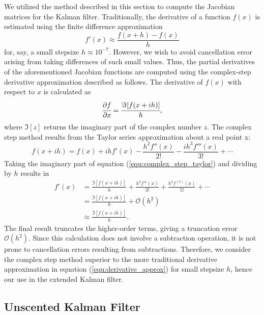 \documentclass[]{article}
\begin{document}
We utilized the method described in this section to compute the Jacobian matrices for the Kalman filter. Traditionally, the derivative of a function $f(x)$ is estimated using the finite difference approximation
\begin{equation}
\label{equ:derivative_approx}
f'(x) \approx \frac{f(x+h) - f(x)}{h}
\end{equation}
for, say, a small stepsize $h \approx 10^{-7}$. However, we wish to avoid cancellation error arising from taking differences of such small values. Thus, the partial derivatives of the aforementioned Jacobian functions are computed using the complex-step derivative approximation described as follows. The derivative of $f(x)$ with respect to $x$ is calculated as
\begin{equation}
\cfrac{\partial f}{\partial x} = \cfrac{\Im [f(x + ih)]}{h},
\label{equ:complex_step}
\end{equation}
where $\Im [z]$ returns the imaginary part of the complex number $z$. The complex step method results from the Taylor series approximation about a real point x:
\begin{equation}
f(x + ih) = f(x) + ihf'(x) - \frac{h^{2}f''(x)}{2!} - \frac{ih^{3}f'''(x)}{3!} + \cdots
\label{equ:complex_step_taylor}
\end{equation}
Taking the imaginary part of equation (\ref{equ:complex_step_taylor}) and dividing by $h$ results in
\begin{equation}
\begin{split}
f'(x) & = \frac{\Im [f(x + ih)]}{h} + \frac{h^{2}f'''(x)}{3!} + \frac{h^{4} f^{(5)}(x)}{5!} + \cdots \\
      & = \frac{\Im [f(x + ih)]}{h} + \mathcal{O}(h^{2}) \\
      & \approx \frac{\Im [f(x + ih)]}{h}.
\end{split}
\label{equ:complex_step_approx}
\end{equation}
The final result truncates the higher-order terms, giving a truncation error $\mathcal{O}(h^{2})$. Since this calculation does not involve a subtraction operation, it is not prone to cancellation errors resulting from subtractions. Therefore, we consider the complex step method superior to the more traditional derivative approximation in equation (\ref{equ:derivative_approx}) for small stepsize $h$, hence our use in the extended Kalman filter.

\subsection{Unscented Kalman Filter}
\end{document}
